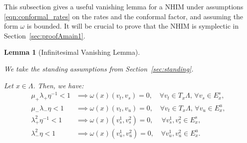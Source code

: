 \documentclass[11pt]{amsart}
\newtheorem{lem}[thm]{Lemma}
\theoremstyle{definition}
\theoremstyle{remark}
\numberwithin{equation}{section}
\begin{document}
This subsection gives a useful vanishing lemma for a NHIM under assumptions \eqref{eqn:conformal_rates} on the rates and the conformal factor, and assuming the form $\omega$ is bounded.
It will be crucial to prove that the NHIM   is symplectic in Section~\ref{sec:proofAmain1}.
\begin{lem}[Infinitesimal Vanishing Lemma]
\label{lem:vanishing}

We take the standing assumptions from Section~\ref{sec:standing}.

Let $x\in\Lambda$.
Then,  we have:
\begin{equation}
\label{eqn:vanishing}
\begin{split}
\mu_+ \lambda_+ \eta^{-1}  < 1 &\implies  \omega(x)(v_t,v_s)= 0, \quad \forall v_t\in T_x\Lambda,
\, \forall v_s\in E_x^s ,
\\
\mu_- \lambda_- \eta  < 1 & \implies  \omega(x)(v_t,v_u)= 0, \quad \forall v_t\in T_x\Lambda,
\, \forall v_u\in E_x^u,
\\
\lambda_+^2 \eta^{-1}<1 & \implies  \omega(x)(v^1_s,v^2_s)=0, \quad \, \forall v^1_s,  v^2_s\in E_x^s,
\\
\lambda_-^2 \eta < 1 & \implies  \omega(x)(v^1_u,v^2_u)=0, \quad  \forall v^1_u , v^2_u\in E_x^u.
\end{split}
\end{equation}
\end{lem}
\end{document}
